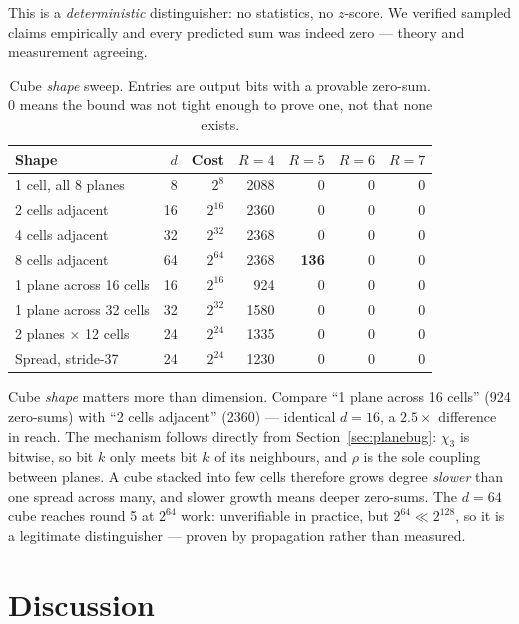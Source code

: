 \documentclass[11pt,a4paper]{article}
\theoremstyle{plain}
\theoremstyle{definition}
\theoremstyle{remark}
\begin{document}
This is a \emph{deterministic} distinguisher: no statistics, no $z$-score. We verified
sampled claims empirically and every predicted sum was indeed zero --- theory and
measurement agreeing.

\begin{table}[h]
\centering
\caption{Cube \emph{shape} sweep. Entries are output bits with a provable zero-sum.
$0$ means the bound was not tight enough to prove one, not that none exists.}
\label{tab:shapes}
\begin{tabular}{lrrrrrr}
\toprule
Shape & $d$ & Cost & $R{=}4$ & $R{=}5$ & $R{=}6$ & $R{=}7$ \\
\midrule
1 cell, all 8 planes    &  8 & $2^{8}$  & 2088 & 0 & 0 & 0 \\
2 cells adjacent        & 16 & $2^{16}$ & 2360 & 0 & 0 & 0 \\
4 cells adjacent        & 32 & $2^{32}$ & 2368 & 0 & 0 & 0 \\
8 cells adjacent        & 64 & $2^{64}$ & 2368 & \textbf{136} & 0 & 0 \\
1 plane across 16 cells & 16 & $2^{16}$ & 924  & 0 & 0 & 0 \\
1 plane across 32 cells & 32 & $2^{32}$ & 1580 & 0 & 0 & 0 \\
2 planes $\times$ 12 cells & 24 & $2^{24}$ & 1335 & 0 & 0 & 0 \\
Spread, stride-37       & 24 & $2^{24}$ & 1230 & 0 & 0 & 0 \\
\bottomrule
\end{tabular}
\end{table}

Cube \emph{shape} matters more than dimension. Compare ``1 plane across 16 cells''
(924 zero-sums) with ``2 cells adjacent'' (2360) --- identical $d = 16$, a
$2.5\times$ difference in reach. The mechanism follows directly from
Section~\ref{sec:planebug}: $\chi_3$ is bitwise, so bit $k$ only meets bit $k$ of its
neighbours, and $\rho$ is the sole coupling between planes. A cube stacked into few
cells therefore grows degree \emph{slower} than one spread across many, and slower
growth means deeper zero-sums. The $d=64$ cube reaches round 5 at $2^{64}$ work:
unverifiable in practice, but $2^{64} \ll 2^{128}$, so it is a legitimate
distinguisher --- proven by propagation rather than measured.

\section{Discussion}
\end{document}
